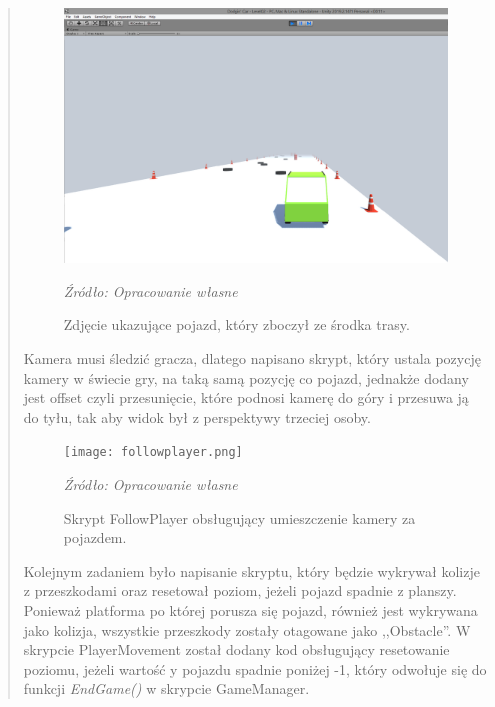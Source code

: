 \begin{quotation}
\begin{figure}[!h]
\centering
  \includegraphics[width=1\linewidth]{playermovelook.png}
  \caption{Zdjęcie ukazujące pojazd, który zboczył ze środka trasy.}\label{rys_5}
  \begin{minipage}[t]{0.75\linewidth}
    \emph{Źródło: Opracowanie własne}
  \end{minipage}
\end{figure}

\newpage
\indent Kamera musi śledzić gracza, dlatego napisano skrypt, który ustala pozycję kamery w świecie gry, na taką samą pozycję co pojazd, jednakże dodany jest offset czyli przesunięcie, które podnosi kamerę do góry i przesuwa ją do tyłu, tak aby widok był z perspektywy trzeciej osoby.

\begin{figure}[!h]
\centering
  \texttt{[image: followplayer.png]}
  \caption{Skrypt FollowPlayer obsługujący umieszczenie kamery za pojazdem.}\label{rys_6}
  \begin{minipage}[t]{0.75\linewidth}
    \emph{Źródło: Opracowanie własne}
  \end{minipage}
\end{figure}

\newpage
\indent Kolejnym zadaniem było napisanie skryptu, który będzie wykrywał kolizje z przeszkodami oraz resetował poziom, jeżeli pojazd spadnie z planszy. Ponieważ platforma po której porusza się pojazd, również jest wykrywana jako kolizja, wszystkie przeszkody zostały otagowane jako ,,Obstacle''. W skrypcie PlayerMovement został dodany kod obsługujący resetowanie poziomu, jeżeli wartość y pojazdu spadnie poniżej -1, który odwołuje się do funkcji \textit{EndGame()} w skrypcie GameManager.


\end{quotation}
